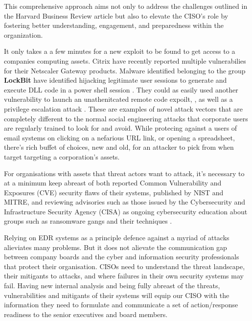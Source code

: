 This comprehensive approach aims not only to address the challenges outlined in the Harvard Business Review article but also to elevate the CISO's role by fostering better understanding, engagement, and preparedness within the organization.


It only takes a a few minutes for a new exploit to be found to get access to a companies computing assets.  Citrix have recently reported multiple
vulnerabilies for their Netscaler Gateway products.  Malware identified belonging to the group \textbf{LockBit} have identified hijacking legitimate user sessions to generate and execute DLL code in a power shell session \autocite{CISA:2023a}.  They could as easily used another vulnerability to launch an unathenitcated remote code expoilt, \autocite{CVE-2023-3519}, as well as a privilege escalation attack \autocite{CVE-2023-3467}.  These are examples of novel attack vectors that  are completely different to the normal social engineering attacks that corporate users are regularly trained to look for and avoid.  While protecing against a users of  email systems on clicking on a nefarious URL link, or opening a spreadsheet, there's rich buffet of choices, new and old, for an attacker to pick from when target targeting a corporation's assets.

For organisations with assets that threat actors want to attack, it's necessary to at a minimum keep abreast of both reported Common Vulnerability and Exposures (CVE)
security flaws of their systems, published by NIST and MITRE, and reviewing advisories such as those issued by the Cybersecurity and Infrastructure Security Agency (CISA)
as ongoing cybersecurity education about groups such as ransomware gangs and their techniques \autocite{CISA:2023}.



Relying on EDR systems as a principle defence against a myriad of attacks alieviates many problems.  But it does not alievate the communication gap between company boards
and the cyber and information security professionals that protect their organisation.  CISOs need to understand the threat landscape, their mitigants to attacks, and
where failures in their own security systems may fail.  Having new internal analysis and being fully abreast of the threats, vulnerabilities and mitigants of their
systems will equip our CISO with the information they need to formulate and communicate a set of action/response readiness to the senior executives and board members. 

